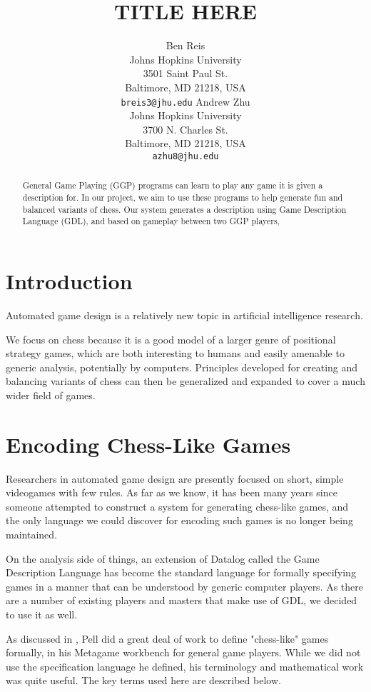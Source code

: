 \documentclass[11pt,letterpaper]{article}
\title{TITLE HERE}
\author{Ben Reis \\
  Johns Hopkins University\\
  3501 Saint Paul St.\\
  Baltimore, MD 21218, USA\\
  {\tt breis3@jhu.edu}
  \And
  Andrew Zhu \\
  Johns Hopkins University \\
  3700 N. Charles St. \\
  Baltimore, MD 21218, USA\\
  {\tt azhu8@jhu.edu}}
\date{}
\begin{document}
\maketitle
\begin{abstract}
General Game Playing (GGP) programs can learn to play any game it is given a description for. In our project, we aim to use these programs to help generate fun and balanced variants of chess. Our system generates a description using Game Description Language (GDL), and based on gameplay between two GGP players,  
\end{abstract}

\section{Introduction}
Automated game design is a relatively new topic in artificial intelligence
research. %


We focus on chess because it is a good model of a larger genre of positional
strategy games, which are both interesting to humans and easily amenable to
generic analysis, potentially by computers. Principles developed for creating
and balancing variants of chess can then be generalized and expanded to cover
a much wider field of games.

\section{Encoding Chess-Like Games}

Researchers in automated game design are presently focused on short, simple
videogames with few rules. As far as we know, it has been many years since
someone attempted to construct a system for generating chess-like games, and the
only language we could discover for encoding such games is no longer being
maintained.

On the analysis side of things, an extension of Datalog called the Game
Description Language has become the standard language for formally specifying
games in a manner that can be understood by generic computer players. As there
are a number of existing players and masters that make use of GDL, we decided to
use it as well.

As discussed in \cite{agd1}, Pell \cite{metagame} did a great deal of work to
define "chess-like" games formally, in his Metagame workbench for general game
players. While we did not use the specification language he defined, his
terminology and mathematical work was quite useful. The key terms used here are
described below.
\end{document}
